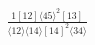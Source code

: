 \documentclass[varwidth, border=5pt]{standalone}
\begin{document}
\begin{my}
$\begin{gathered}
\scriptscriptstyle\frac{1[12]⟨45⟩^2[13]}{⟨12⟩⟨14⟩[14]^2⟨34⟩}
\end{gathered}$
\end{my}
\end{document}
